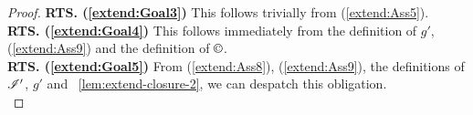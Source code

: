 \begin{lemma}
\begin{proof}
\noindent\textbf{RTS. (\ref{extend:Goal3})}
This follows trivially from (\ref{extend:Ass5}).\\

\noindent\textbf{RTS. (\ref{extend:Goal4})}
This follows immediately from the definition of $g'$, (\ref{extend:Ass9}) and the definition of $\containI$.\\

\noindent\textbf{RTS. (\ref{extend:Goal5})}
From (\ref{extend:Ass8}), (\ref{extend:Ass9}), the definitions of $\mathscr{I}'$, $g'$ and \lem~\ref{lem:extend-closure-2}, we can despatch this obligation.\\


\end{proof}
\end{lemma}
